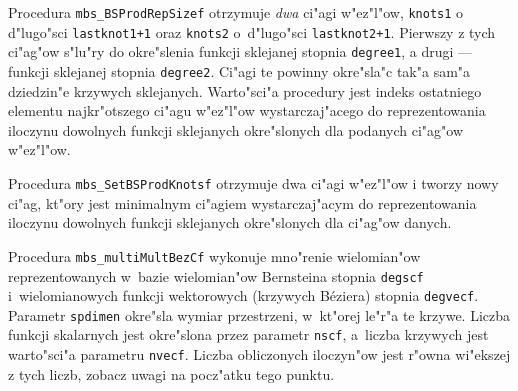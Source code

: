 \vspace{\bigskipamount}
Procedura \texttt{mbs\_BSProdRepSizef} otrzymuje \emph{dwa} ci"agi w"ez"l"ow,
\texttt{knots1} o d"lugo"sci \texttt{lastknot1+1} oraz \texttt{knots2}
o~d"lugo"sci \texttt{lastknot2+1}. Pierwszy z tych ci"ag"ow s"lu"ry do
okre"slenia funkcji sklejanej stopnia \texttt{degree1}, a drugi --- funkcji
sklejanej stopnia \texttt{degree2}. Ci"agi te powinny okre"sla"c tak"a sam"a
dziedzin"e krzywych sklejanych. Warto"sci"a procedury jest indeks ostatniego
elementu najkr"otszego ci"agu w"ez"l"ow wystarczaj"acego do reprezentowania
iloczynu dowolnych funkcji sklejanych okre"slonych dla podanych ci"ag"ow
w"ez"l"ow.

\vspace{\bigskipamount}
Procedura \texttt{mbs\_SetBSProdKnotsf} otrzymuje dwa ci"agi w"ez"l"ow i tworzy
nowy ci"ag, kt"ory jest minimalnym ci"agiem wystarczaj"acym do
reprezentowania iloczynu dowolnych funkcji sklejanych okre"slonych dla
ci"ag"ow danych.

\vspace{\bigskipamount}
Procedura \texttt{mbs\_multiMultBezCf} wykonuje mno"renie wielomian"ow
reprezentowanych w~bazie wielomian"ow Bernsteina stopnia \texttt{degscf}
i~wielomianowych funkcji wektorowych (krzywych B\'{e}ziera) stopnia
\texttt{degvecf}. Parametr \texttt{spdimen} okre"sla wymiar przestrzeni,
w~kt"orej le"r"a te krzywe. Liczba funkcji skalarnych jest okre"slona przez
parametr \texttt{nscf}, a~liczba krzywych jest warto"sci"a parametru
\texttt{nvecf}. Liczba obliczonych iloczyn"ow jest r"owna wi"ekszej z tych
liczb, zobacz uwagi na pocz"atku tego punktu.

